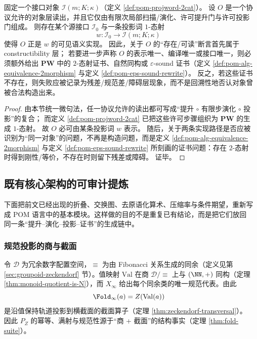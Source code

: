 \begin{proposition}[对象层读出必须先落入可构造投影词类]\label{prop:pom-object-constructibility-before-rigidity}
固定一个接口对象 \(\mathcal I(m;K;\kappa)\)（定义 \ref{def:pom-projword-2cat}）。
设 \(O\) 是一个协议允许的对象层读出，并且它仅由有限次局部扫描/演化、许可提升门与许可投影门组成。
则存在某个源接口 \(\mathcal I_0\) 与一条投影词 \(1\)-态射
\[
w:\mathcal I_0\longrightarrow \mathcal I(m;K;\kappa)
\]
使得 \(O\) 正是 \(w\) 的可见语义实现。
因此，关于 \(O\) 的“存在/可读”断言首先属于 constructibility 层；
若要进一步声称 \(O\) 的表示唯一、编译唯一或接口唯一，则必须额外给出 \(\mathbf{PW}\) 中的 \(2\)-态射证书、自然同构或 \(\varepsilon\)-sound 证书（定义 \ref{def:pom-alg-equivalence-2morphism} 与定义 \ref{def:pom-eps-sound-rewrite}）。
反之，若这些证书不存在，则失败应被记录为残差/规范差/障碍层现象，而不是回溯性地否认对象曾被合法构造出来。
\end{proposition}
\begin{proof}
由本节统一微句法，任一协议允许的读出都可写成“提升 \(\circ\) 有限步演化 \(\circ\) 投影”的复合；
而定义 \ref{def:pom-projword-2cat} 已把这些许可步骤组织为 \(\mathbf{PW}\) 的生成 \(1\)-态射。
故 \(O\) 必可由某条投影词 \(w\) 表示。
随后，关于两条实现路径是否应被识别为“同一对象”的问题，不再是构造问题，而是定义 \ref{def:pom-alg-equivalence-2morphism} 与定义 \ref{def:pom-eps-sound-rewrite} 所刻画的证书问题：存在 \(2\)-态射时得到刚性/等价，不存在时则留下残差或障碍。
证毕。
\end{proof}

\subsection{既有核心架构的可审计提炼}\label{subsec:pom-hard-skeleton}
下面把前文已经出现的折叠、交换图、去原语化算术、压缩率与条件期望，重新写成 POM 语言中的基本模块。这样做的目的不是重复已有结论，而是把它们放回同一条“提升--演化--投影--证书”的生成链中。

\subsubsection{规范投影的商与截面}\label{subsec:pom-quotient-section}
令 $\mathcal{D}$ 为冗余数字配置空间，$\equiv$ 为由 Fibonacci 关系生成的同余（定义见第 \ref{sec:groupoid-zeckendorf} 节）。值映射 $\mathrm{Val}$ 在商 $\mathcal{D}/\!\equiv$ 上与 $(\NN,+)$ 同构（定理 \ref{thm:monoid-quotient-is-N}），而 $X_\infty$ 给出每个同余类的唯一规范代表。由此
\[
\Fold_\infty(a)=Z(\mathrm{Val}(a))
\]
是沿值保持轨道投影到横截面的截面算子（定理 \ref{thm:zeckendorf-transversal}）。因此 $P_Z$ 的幂等、满射与规范性源于“商 + 截面”的结构事实（定理 \ref{thm:fold-suite}）。

